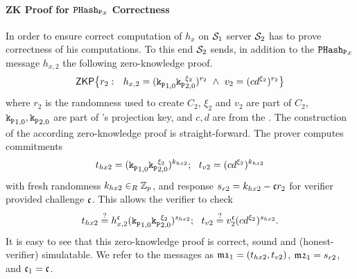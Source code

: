 
\paragraph{ZK Proof for $\mathtt{PHash_P}_x$ Correctness}
In order to ensure correct computation of $h_x$ on $\mathcal{S}_1$ server $\mathcal{S}_2$ has to prove correctness of his computations.
To this end $\mathcal{S}_2$ sends, in addition to the $\mathtt{PHash_P}_x$ message $h_{x,2}$ the following zero-knowledge proof.
\begin{equation}
    \mathsf{ZKP}\big\{ r_2:~~ h_{x,2} = (\mathtt{k_p}_{1,0} \mathtt{k_p}_{2,0}^{\xi_2})^{r_2} ~ \wedge ~ v_2=(cd^{\xi_2})^{r_2} \big\}
\end{equation}
where $r_2$ is the randomness used to create $C_2$, $\xi_2$ and $v_2$ are part of $C_2$, $\mathtt{k_p}_{1,0},\mathtt{k_p}_{2,0}$ are part of \Client's projection key, and $c,d$ are from the \crs.
The construction of the according zero-knowledge proof is straight-forward. 
The prover computes commitments
\[ t_{hx2} = (\mathtt{k_p}_{1,0} \mathtt{k_p}_{2,0}^{\xi_2})^{k_{hx2}}; ~~ t_{v2} = (cd^{\xi_2})^{k_{hx2}} \]
with fresh randomness $k_{hx2}\in_R\mathbb{Z}_p$, and response $s_{r2} = k_{hx2} - \mathfrak{c} r_2$ for verifier provided challenge $\mathfrak{c}$.
This allows the verifier to check
\[ t_{hx2} \stackrel{?}{=} h_{x,2}^\mathfrak{c} (\mathtt{k_p}_{1,0} \mathtt{k_p}_{2,0}^{\xi_2})^{s_{hx2}}; ~~ t_{v2} \stackrel{?}{=} v_2^\mathfrak{c} (cd^{\xi_2})^{s_{hx2}}. \]
It is easy to see that this zero-knowledge proof is correct, sound and (honest-verifier) simulatable.
We refer to the messages as $\mathfrak{m1}_{1}=(t_{hx2}, t_{v2})$, $\mathfrak{m2}_{1}=s_{r2}$, and $\mathfrak{c}_{1}=\mathfrak{c}$.

